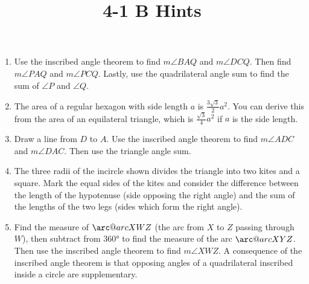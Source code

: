 \documentclass{article}
\title{4-1 B Hints}
\author{}
\date{}
\makeatletter
\newcommand{\arc@char}{{\usefont{U}{tipa}{m}{n}\symbol{62}}}%
\newcommand{\arc}[1]{\mathpalette\arc@arc{#1}}
\newcommand{\arc@arc}[2]{%
  \sbox0{$\m@th#1#2$}%
  \vbox{
    \hbox{\resizebox{\wd0}{\height}{\arc@char}}
    \nointerlineskip
    \box0
  }%
}
\makeatother
\begin{document}
\maketitle

\begin{enumerate}
	\item Use the inscribed angle theorem to find $m\angle BAQ$ and $m\angle DCQ$.
		Then find $m\angle PAQ$ and $m\angle PCQ$.
		Lastly, use the quadrilateral angle sum to find the sum of $\angle P$ and $\angle Q$.
	\item The area of a regular hexagon with side length $a$ is $\frac{3\sqrt{3}}{2}a^2$.
		You can derive this from the area of an equilateral triangle, which is $\frac{\sqrt{3}}{4}a^2$ if $a$ is the side length.
	\item Draw a line from $D$ to $A$.
		Use the inscribed angle theorem to find $m\angle ADC$ and $m\angle DAC$.
		Then use the triangle angle sum.
	\item The three radii of the incircle shown divides the triangle into two kites and a square.
		Mark the equal sides of the kites and consider the difference between the length of the hypotenuse (side opposing the right angle) and the sum of the lengths of the two legs (sides which form the right angle).
	\item Find the measure of $\arc{XWZ}$ (the arc from $X$ to $Z$ passing through $W$), then subtract from $\ang{360}$ to find the measure of the arc $\arc{XYZ}$.
		Then use the inscribed angle theorem to find $m\angle XWZ$.
		A consequence of the inscribed angle theorem is that opposing angles of a quadrilateral inscribed inside a circle are supplementary.
\end{enumerate}
\end{document}
